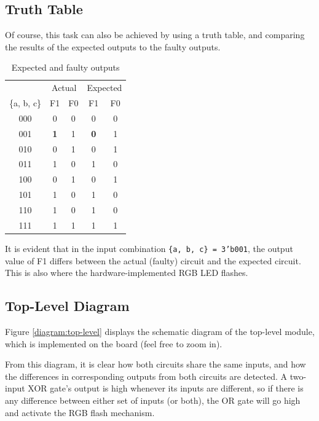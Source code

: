 \documentclass{article}
\renewcommand{\c}[1]{\texttt{#1}}
\begin{document}
\subsection{Truth Table} Of course, this task can also be
achieved by using a truth table, and comparing the results
of the expected outputs to the faulty outputs.

\begin{table}[H]
    \centering
    \begin{tabular}{c|cc|cc}
        & \multicolumn{2}{c|}{Actual} & \multicolumn{2}{c}{Expected} \\
       \{a, b, c\} & \multicolumn{1}{c|}{F1} & F0 & \multicolumn{1}{c|}{F1} & F0 \\ \hline
       000 & 0 & 0 & 0 & 0 \\
       001 & \textbf{1} & 1 & \textbf{0} & 1 \\
       010 & 0 & 1 & 0 & 1 \\
       011 & 1 & 0 & 1 & 0 \\
       100 & 0 & 1 & 0 & 1 \\
       101 & 1 & 0 & 1 & 0 \\
       110 & 1 & 0 & 1 & 0 \\
       111 & 1 & 1 & 1 & 1
    \end{tabular}
    \caption{Expected and faulty outputs}
    \label{truthtable}
\end{table}

It is evident that in the input combination
\c{\{a, b, c\} = 3'b001}, the output value of F1 differs
between the actual (faulty) circuit and the expected circuit.
This is also where the hardware-implemented RGB LED flashes.

\subsection{Top-Level Diagram} Figure \ref{diagram:top-level}
displays the schematic diagram of the top-level module,
which is implemented on the board (feel free to zoom in).

From this diagram, it is clear how both circuits share
the same inputs, and how the differences in
corresponding outputs from both circuits are detected.
A two-input XOR gate's output is high whenever its inputs
are different, so if there is any difference between either
set of inputs (or both), the OR gate will go high and activate
the RGB flash mechanism.
\end{document}
